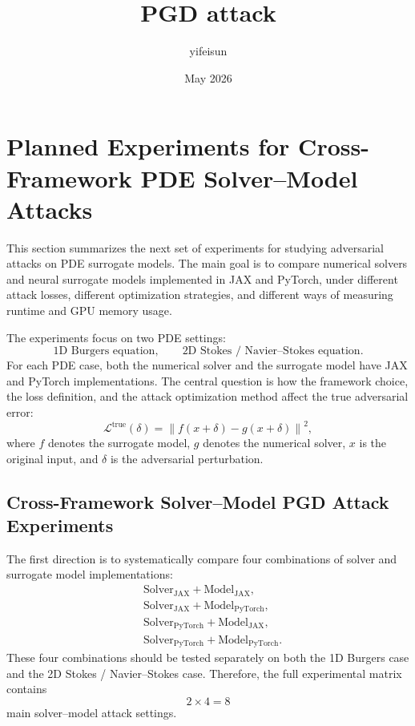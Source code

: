 \documentclass{article}
\title{PGD attack}
\author{yifeisun }
\date{May 2026}
\begin{document}
\maketitle

\section{Planned Experiments for Cross-Framework PDE Solver--Model Attacks}

This section summarizes the next set of experiments for studying adversarial attacks on PDE surrogate models. The main goal is to compare numerical solvers and neural surrogate models implemented in JAX and PyTorch, under different attack losses, different optimization strategies, and different ways of measuring runtime and GPU memory usage.

The experiments focus on two PDE settings:
\[
\text{1D Burgers equation},
\qquad
\text{2D Stokes / Navier--Stokes equation}.
\]
For each PDE case, both the numerical solver and the surrogate model have JAX and PyTorch implementations. The central question is how the framework choice, the loss definition, and the attack optimization method affect the true adversarial error:
\[
\mathcal{L}^{\mathrm{true}}(\delta)
=
\left\|
f(x+\delta) - g(x+\delta)
\right\|^2,
\]
where \(f\) denotes the surrogate model, \(g\) denotes the numerical solver, \(x\) is the original input, and \(\delta\) is the adversarial perturbation.

\subsection{Cross-Framework Solver--Model PGD Attack Experiments}

The first direction is to systematically compare four combinations of solver and surrogate model implementations:
\[
\begin{aligned}
&\text{Solver}_{\mathrm{JAX}} + \text{Model}_{\mathrm{JAX}}, \\
&\text{Solver}_{\mathrm{JAX}} + \text{Model}_{\mathrm{PyTorch}}, \\
&\text{Solver}_{\mathrm{PyTorch}} + \text{Model}_{\mathrm{JAX}}, \\
&\text{Solver}_{\mathrm{PyTorch}} + \text{Model}_{\mathrm{PyTorch}}.
\end{aligned}
\]
These four combinations should be tested separately on both the 1D Burgers case and the 2D Stokes / Navier--Stokes case. Therefore, the full experimental matrix contains
\[
2 \times 4 = 8
\]
main solver--model attack settings.
\end{document}
